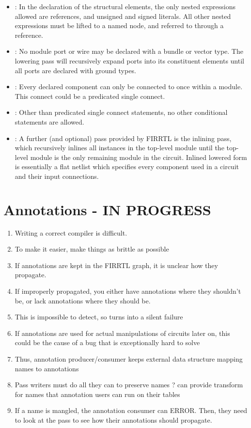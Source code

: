 \documentclass[12pt]{article}
\begin{document}
\begin{itemize}
\item {} : 
In the declaration of the structural elements, the only nested expressions allowed are references, and unsigned and signed literals.
All other nested expressions must be lifted to a named node, and referred to through a reference. 
\item {} :
No module port or wire may be declared with a bundle or vector type.
The lowering pass will recursively expand ports into its constituent elements until all ports are declared with ground types.
\item {} :
Every declared component can only be connected to once within a module.
This connect could be a predicated single connect.
\item {} :
Other than predicated single connect statements, no other conditional statements are allowed.
\item {} :
A further (and optional) pass provided by FIRRTL is the inlining pass, which recursively inlines all instances in the top-level module until the top-level module is the only remaining module in the circuit.
Inlined lowered form is essentially a flat netlist which specifies every component used in a circuit and their input connections. 
\end{itemize}

\section{Annotations - IN PROGRESS}
\begin{enumerate}[topsep=3pt,itemsep=-0.5ex,partopsep=1ex,parsep=1ex]
\item Writing a correct compiler is difficult.
\item To make it easier, make things as brittle as possible
\item If annotations are kept in the FIRRTL graph, it is unclear how they propagate.
\item If improperly propagated, you either have annotations where they shouldn't be, or lack annotations where they should be.
\item This is impossible to detect, so turns into a silent failure
\item If annotations are used for actual manipulations of circuits later on, this could be the cause of a bug that is exceptionally hard to solve
\item Thus, annotation producer/consumer keeps external data structure mapping names to annotations
\item Pass writers must do all they can to preserve names ? can provide transform for names that annotation users can run on their tables
\item If a name is mangled, the annotation consumer can ERROR. Then, they need to look at the pass to see how their annotations should propagate.
\end{enumerate}
\end{document}
